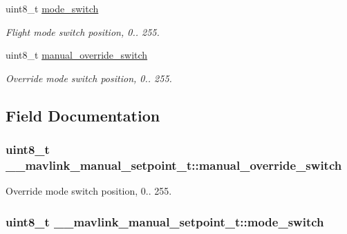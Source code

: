 \begin{DoxyCompactItemize}
uint8\+\_\+t \hyperlink{struct____mavlink__manual__setpoint__t_ac3e1509a46421fac372fc2e917b85c1c}{mode\+\_\+switch}
\begin{DoxyCompactList}\small\item\em Flight mode switch position, 0.. 255. \end{DoxyCompactList}\item 
uint8\+\_\+t \hyperlink{struct____mavlink__manual__setpoint__t_ac32326ac4f3f6983bfc36717d432643f}{manual\+\_\+override\+\_\+switch}
\begin{DoxyCompactList}\small\item\em Override mode switch position, 0.. 255. \end{DoxyCompactList}\end{DoxyCompactItemize}


\subsection{Field Documentation}
\hypertarget{struct____mavlink__manual__setpoint__t_ac32326ac4f3f6983bfc36717d432643f}{
\subsubsection[{manual\+\_\+override\+\_\+switch}]{\setlength{\rightskip}{0pt plus 5cm}uint8\+\_\+t \+\_\+\+\_\+mavlink\+\_\+manual\+\_\+setpoint\+\_\+t\+::manual\+\_\+override\+\_\+switch}}\label{struct____mavlink__manual__setpoint__t_ac32326ac4f3f6983bfc36717d432643f}


Override mode switch position, 0.. 255. 

\hypertarget{struct____mavlink__manual__setpoint__t_ac3e1509a46421fac372fc2e917b85c1c}{
\subsubsection[{mode\+\_\+switch}]{\setlength{\rightskip}{0pt plus 5cm}uint8\+\_\+t \+\_\+\+\_\+mavlink\+\_\+manual\+\_\+setpoint\+\_\+t\+::mode\+\_\+switch}}\label{struct____mavlink__manual__setpoint__t_ac3e1509a46421fac372fc2e917b85c1c}


